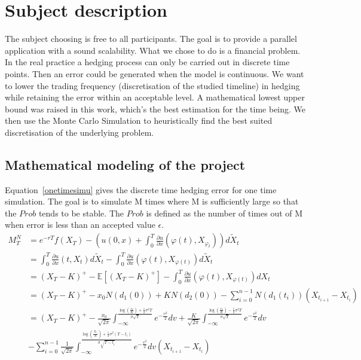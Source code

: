 \chapter{Subject description}
\label{chp:2}

The subject choosing is free to all participants. The goal is to provide a parallel application with a sound scalability. 
What we chose to do is a financial problem. In the real practice a hedging process can only be carried out in discrete time 
points. Then an error could be generated when the model is continuous. We want to lower the trading frequency 
(discretisation of the studied timeline) in hedging while 
retaining the error within an acceptable level. A mathematical lowest upper bound was raised in this work, which's the best 
estimation for the time being. We then use the Monte Carlo Simulation to heuristically find the best suited discretisation of 
the underlying problem. 

\section{Mathematical modeling of the project}
Equation~\ref{onetimesimu} gives the discrete time hedging error for one time simulation. The goal is to simulate M times where M is 
sufficiently large so that the $Prob$ tends to be stable. The $Prob$ is defined as the number of times out of M when error is less than 
an accepted value $\epsilon$. 
\begin{equation}
\label{onetimesimu}
\begin{split}
M_T^N
&=e^{-rT}f(X_T)-(u(0,x)+\int_0^T\frac{\partial u}{\partial x}(\varphi(t), 
X_{\varphi_t}))d\widetilde{X}_t\\
&=\int_0^T\frac{\partial u}{\partial x}(t, X_t)d\widetilde{X}_t-\int_0^T\frac{\partial u}{\partial x}(\varphi(t), X_{\varphi(t)})d\widetilde{X}_t\\
&=(X_T-K)^+-\mathbb{E}[(X_T-K)^+]-\int_0^T\frac{\partial u}{\partial x}(\varphi(t), X_{\varphi(t)})dX_t\\
&=(X_T-K)^+-x_0N(d_1(0))+KN(d_2(0))-\sum_{i=0}^{n-1}N(d_1(t_i))(X_{t_{i+1}}-X_{t_i})\\
&=(X_T-K)^+-\frac{x_0}{\sqrt{2\pi}}\int_{-\infty}^{\frac{\log(\frac{x_0}{K})+\frac{1}{2}\sigma^2T}
{\sigma\sqrt{T}}}e^{-\frac{v^2}{2}}dv+\frac{K}{\sqrt{2\pi}}\int_{-\infty}^{\frac{\log(\frac{x_0}{K})-\frac{1}{2}\sigma^2T}{\sigma\sqrt{T}}}e^{-\frac{v^2}{2}}dv\\
&-\sum_{i=0}^{n-1}\frac{1}{\sqrt{2\pi}}\int_{-\infty}^{\frac{\log(\frac{X_{t_i}}{K})+\frac{1}{2}\sigma^2(T-t_i)}{\sigma\sqrt{T-t_i}}}e^{-\frac{v^2}{2}}dv(X_{t_{i+1}}-X_{t_i})\\
\end{split}
\end{equation}

